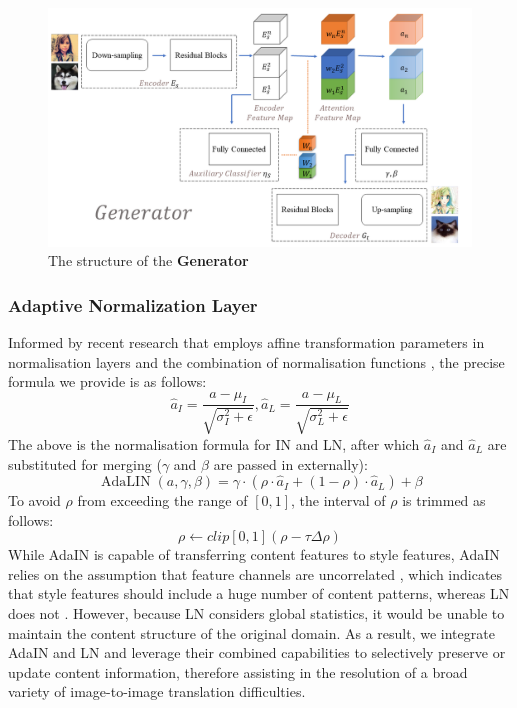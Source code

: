 \documentclass{article}
\begin{document}
\begin{figure}
\centerline{\includegraphics[width=1\columnwidth]{Images/Generator.png}}\caption{The structure of the \textbf{Generator}}
\label{fig:Generator}
\end{figure} 

\subsubsection{Adaptive Normalization Layer}
Informed by recent research that employs affine transformation parameters in normalisation layers and the combination of normalisation functions \cite{Arbitrary}\cite{Batch-Instance}, the precise formula we provide is as follows:
$$ \hat{a}_{I}=\frac{a-\mu_{I}}{\sqrt{\sigma_{I}^{2}+\epsilon}}, \hat{a}_{L}=\frac{a-\mu_{L}}{\sqrt{\sigma_{L}^{2}+\epsilon}} $$
The above is the normalisation formula for IN and LN, after which $\hat{a}_{I}$ and $\hat{a}_{L}$ are substituted for merging ($\gamma$ and $\beta$ are passed in externally):
$$ \operatorname{AdaLIN}(a, \gamma, \beta)=\gamma \cdot\left(\rho \cdot \hat{a}_{I}+(1-\rho) \cdot \hat{a}_{L}\right)+\beta $$
To avoid $\rho$ from exceeding the range of $[0,1]$, the interval of $\rho$ is trimmed as follows:
$$ \rho \leftarrow c l i p[0,1](\rho-\tau \Delta \rho) $$
While AdaIN is capable of transferring content features to style features, AdaIN relies on the assumption that feature channels are uncorrelated \cite{Arbitrary}, which indicates that style features should include a huge number of content patterns, whereas LN does not \cite{Layer_normalization}. However, because LN considers global statistics, it would be unable to maintain the content structure of the original domain. As a result, we integrate AdaIN and LN and leverage their combined capabilities to selectively preserve or update content information, therefore assisting in the resolution of a broad variety of image-to-image translation difficulties.
\end{document}
